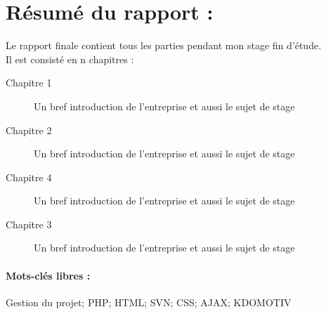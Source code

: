 \chapter{Résumé du rapport :}
\flushleft
Le rapport finale  contient tous les parties pendant mon stage fin d'étude.\\
Il est consisté en n chapitres :
\begin{description}
  \item[Chapitre 1] Un bref introduction de l'entreprise et aussi le sujet de stage
  \item[Chapitre 2] Un bref introduction de l'entreprise et aussi le sujet de stage
  \item[Chapitre 4] Un bref introduction de l'entreprise et aussi le sujet de stage
  \item[Chapitre 3] Un bref introduction de l'entreprise et aussi le sujet de stage
\end{description}
\subsubsection*{Mots-clés libres :}
Gestion du projet; PHP; HTML; SVN; CSS; AJAX; KDOMOTIV
